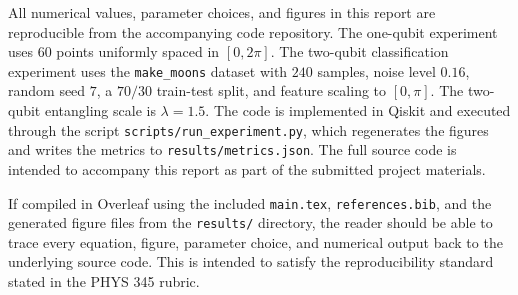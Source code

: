 \documentclass[11pt]{article}
\begin{document}
All numerical values, parameter choices, and figures in this report are reproducible from the accompanying code repository. The one-qubit experiment uses $60$ points uniformly spaced in $[0,2\pi]$. The two-qubit classification experiment uses the \texttt{make\_moons} dataset with $240$ samples, noise level $0.16$, random seed $7$, a $70/30$ train-test split, and feature scaling to $[0,\pi]$. The two-qubit entangling scale is $\lambda=1.5$. The code is implemented in Qiskit and executed through the script \texttt{scripts/run\_experiment.py}, which regenerates the figures and writes the metrics to \texttt{results/metrics.json}. The full source code is intended to accompany this report as part of the submitted project materials.

If compiled in Overleaf using the included \texttt{main.tex}, \texttt{references.bib}, and the generated figure files from the \texttt{results/} directory, the reader should be able to trace every equation, figure, parameter choice, and numerical output back to the underlying source code. This is intended to satisfy the reproducibility standard stated in the PHYS 345 rubric.



\end{document}
